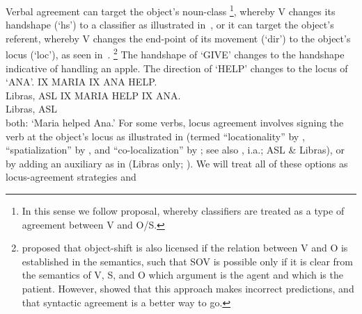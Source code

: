 \documentclass[output=paper,colorlinks,citecolor=brown,
]{langscibook}
\begin{document}
    \z 
\z
Verbal agreement can target the object's noun-class%
\footnote{
    In this sense we follow  proposal, whereby
    classifiers are treated as a type of agreement between V and O/S.
}, 
whereby V
changes its handshape (`hs') to a classifier as illustrated in~, or it
can target the object's referent, whereby V changes the end-point of its
movement (`dir') to the object's locus (`loc'), as seen in~.%
\footnote{
    \citet{Fischer.1975} proposed that object-shift is also licensed if the relation
    between V and O is established in the semantics, such that SOV is possible only if it
    is clear from the semantics of V, S, and O which argument is the agent and which is
    the patient. However, \citet{Liddell.1980} showed that this approach makes incorrect
    predictions, and that syntactic agreement is a better way to go.
}
\ea 
    \label{lasz:ex:3}
    The handshape of `GIVE' changes to the \laszClaw{} handshape indicative of handling an apple. 
    \z 
\ex
    \label{lasz:ex:4}
    The direction of `HELP' changes to the locus of `ANA'. 
    \ea 
        IX MARIA IX ANA HELP. \\
        \citep[from][6]{Quadros.etal.2004}
        \hfill 
        \cmark Libras, \cmark ASL 
    \ex 
        IX MARIA HELP IX ANA. \\
        \citep[from][5]{Quadros.etal.2004} 
        \hfill 
        \cmark Libras, \cmark ASL \\
        both: `Maria helped Ana.'
    \z 
\z 
For some verbs, locus agreement involves signing the verb at the
object's locus as illustrated in  (termed ``locationality'' by \citealp{Fischer.Gough.1978}, 
``spatialization'' by \citealp{Quadros.etal.2004}, 
and ``co-localization'' by \citealp{Lourenco.Wilbur.2018}; 
see also \citealp{Bergman.1980,Liddell.1980,Costello.2015,Smith.1990}, i.a.; ASL \& Libras),
or by adding an auxiliary as in  (Libras only; \citealp{Quadros.1999}). We
will treat all of these options as locus-agreement strategies and
\end{document}
